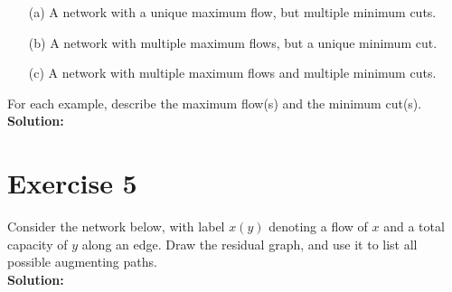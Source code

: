 \documentclass{article}
\begin{document}
\begin{itemize}
    \item[(a)] A network with a unique maximum flow, but multiple minimum cuts.
    \item[(b)] A network with multiple maximum flows, but a unique minimum cut.
    \item[(c)] A network with multiple maximum flows and multiple minimum cuts.
\end{itemize}

For each example, describe the maximum flow(s) and the minimum cut(s). \\

\textbf{Solution:} \\



\newpage

\section*{Exercise 5}
Consider the network below, with label $x(y)$ denoting a flow of $x$ and a total capacity of $y$ along an edge. Draw the residual graph, and use it to list all possible augmenting paths. \\

\textbf{Solution:} \\
\end{document}
